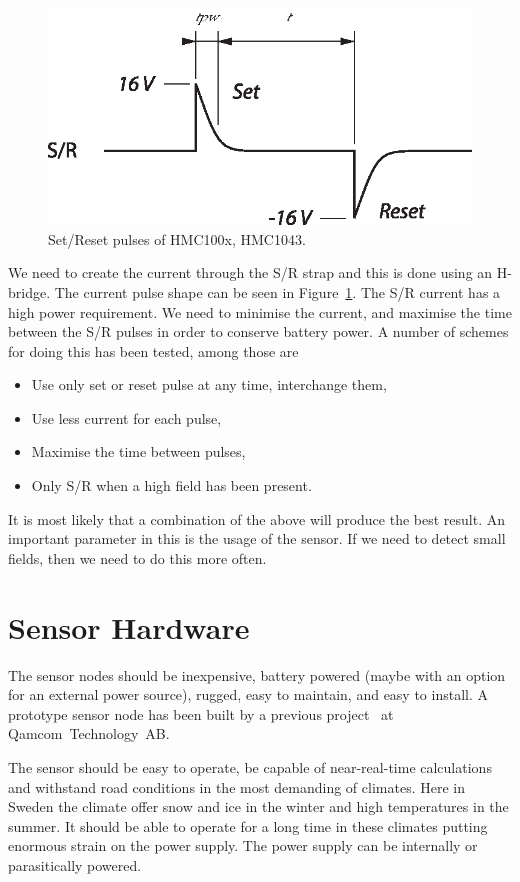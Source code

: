 \begin{figure}
\centering
\begin{minipage}{0.4\linewidth}
 \centering
 \includegraphics[width=1\linewidth]{images/set-reset}
 \caption[Set/Reset pulses for magnetic sensor]{Set/Reset pulses of HMC100x, HMC1043.}
 \label{fig-setreset}
\end{minipage}
\end{figure}

We need to create the current through the S/R strap and this is done using an H-bridge. The current pulse shape can be seen in Figure~\ref{fig-setreset}. The S/R current has a high power requirement. We need to minimise the current, and maximise the time between the S/R pulses in order to conserve battery power. A number of schemes for doing this has been tested, among those are

\begin{itemize}
 \item Use only set or reset pulse at any time, interchange them,
 \item Use less current for each pulse,
 \item Maximise the time between pulses,
 \item Only S/R when a high field has been present.
\end{itemize}

It is most likely that a combination of the above will produce the best result. An important parameter in this is the usage of the sensor. If we need to detect small fields, then we need to do this more often. 

\section{Sensor Hardware}\label{cha:hardware}

The sensor nodes should be inexpensive, battery powered (maybe with an option for an external power source), rugged, easy to maintain, and easy to install. A prototype sensor node has been built by a previous project~\cite{arrigault2007} at Qamcom~Technology~AB. 

The sensor should be easy to operate, be capable of near-real-time calculations and withstand road conditions in the most demanding of climates. Here in Sweden the climate offer snow and ice in the winter and high temperatures in the summer. It should be able to operate for a long time in these climates putting enormous strain on the power supply. The power supply can be internally or parasitically powered.